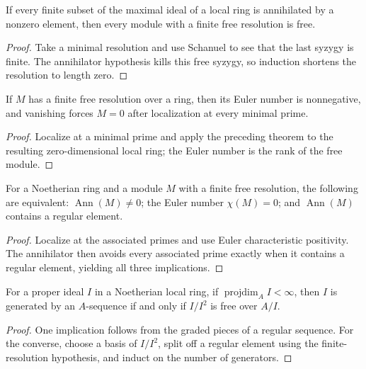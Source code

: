 \begin{theorem}\label{mcrt-thm-19-6}\uses{}
If every finite subset of the maximal ideal of a local ring is annihilated by a
nonzero element, then every module with a finite free resolution is free.
\end{theorem}
\begin{proof}
Take a minimal resolution and use Schanuel to see that the last syzygy is finite.
The annihilator hypothesis kills this free syzygy, so induction shortens the
resolution to length zero.
\end{proof}

\begin{theorem}\label{mcrt-thm-19-7}
If $M$ has a finite free resolution over a ring, then its Euler number is
nonnegative, and vanishing forces $M=0$ after localization at every minimal
prime.
\end{theorem}
\begin{proof}
Localize at a minimal prime and apply the preceding theorem to the resulting
zero-dimensional local ring; the Euler number is the rank of the free module.
\end{proof}

\begin{theorem}\label{mcrt-thm-19-8}
For a Noetherian ring and a module $M$ with a finite free resolution, the
following are equivalent: $\operatorname{Ann}(M)\ne0$; the Euler number
$\chi(M)=0$; and $\operatorname{Ann}(M)$ contains a regular element.
\end{theorem}
\begin{proof}
Localize at the associated primes and use Euler characteristic positivity.  The
annihilator then avoids every associated prime exactly when it contains a
regular element, yielding all three implications.
\end{proof}

\begin{theorem}\label{mcrt-thm-19-9}
For a proper ideal $I$ in a Noetherian local ring, if
$\operatorname{projdim}_A I<\infty$, then $I$ is generated by an $A$-sequence
if and only if $I/I^2$ is free over $A/I$.
\end{theorem}
\begin{proof}
One implication follows from the graded pieces of a regular sequence.  For the
converse, choose a basis of $I/I^2$, split off a regular element using the
finite-resolution hypothesis, and induct on the number of generators.
\end{proof}
